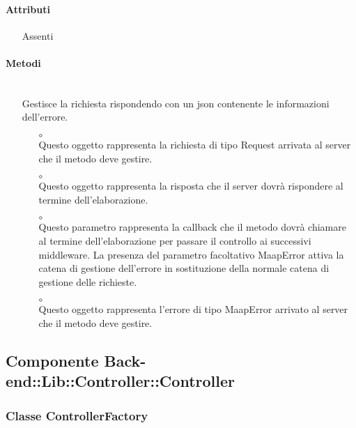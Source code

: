 \paragraph*{Attributi}
\begin{itemize}
\item[] Assenti
\end{itemize}

\paragraph*{Metodi}
\begin{itemize}
\item[]  \\ Gestisce la richiesta rispondendo con un json contenente le informazioni dell'errore.
\begin{itemize}\addtolength{\itemsep}{-0.5\baselineskip}
\item[$\circ$]  \\ Questo oggetto rappresenta la richiesta di tipo Request arrivata al server che il metodo deve gestire.
\item[$\circ$]  \\ Questo oggetto rappresenta la risposta che il server dovrà rispondere al termine dell'elaborazione.
\item[$\circ$]  \\ Questo parametro rappresenta la callback che il metodo dovrà chiamare al termine dell'elaborazione per passare il controllo ai successivi middleware. La presenza del parametro facoltativo MaapError attiva la catena di gestione dell'errore in sostituzione della normale catena di gestione delle richieste.
\item[$\circ$]  \\ Questo oggetto rappresenta l'errore di tipo MaapError arrivato al server che il metodo deve gestire.
\end{itemize}
\end{itemize}

\subsection{Componente Back-end::Lib::Controller::Controller}

\subsubsection{Classe ControllerFactory}

